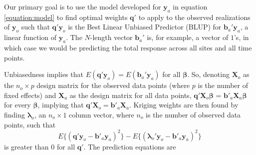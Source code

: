 \documentclass[smallextended]{svjour3}       %
\begin{document}
Our primary goal is to use the model developed for \(\mathbf{y}_a\) in
equation \ref{equation:model} to find optimal weights \(\mathbf{q}'\) to
apply to the observed realizations of \(\mathbf{y}_o\) such that
\(\mathbf{q}' \mathbf{y}_o\) is the Best Linear Unbiased Predictor
(BLUP) for \(\mathbf{b}_a' \mathbf{y}_a\), a linear function of
\(\mathbf{y}_a\). The \(N\)-length vector \(\mathbf{b}_a'\) is, for
example, a vector of \(1\)'s, in which case we would be predicting the
total response across all sites and all time points.

Unbiasedness implies that
\(E(\mathbf{q'}\mathbf{y}_o) = E(\mathbf{b}_a'\mathbf{y}_a)\) for all
\(\bm{\beta}\). So, denoting \(\mathbf{X}_o\) as the \(n_o \times p\)
design matrix for the observed data points (where \(p\) is the number of
fixed effects) and \(\mathbf{X}_a\) as the design matrix for all data
points, \(\mathbf{q'} \mathbf{X}_o \bm{\beta}\) =
\(\mathbf{b'}_a \mathbf{X}_a \bm{\beta}\) for every \(\bm{\beta}\),
implying that \(\mathbf{q'} \mathbf{X}_o = \mathbf{b'}_a \mathbf{X}_a\).
Kriging weights are then found by finding \(\bm{\lambda}_o\), an
\(n_o \times 1\) column vector, where \(n_o\) is the number of observed
data points, such that \mbox{} \begin{equation}
E\{(\mathbf{q'}\mathbf{y}_o - \mathbf{b'}_a \mathbf{y}_a)^2\} - E\{(\bm{\lambda}_o'\mathbf{y}_o - \mathbf{b'}_a \mathbf{y}_a)^2\}
\end{equation} \noindent is greater than 0 for all \(\mathbf{q'}\). The
prediction equations are
\end{document}
